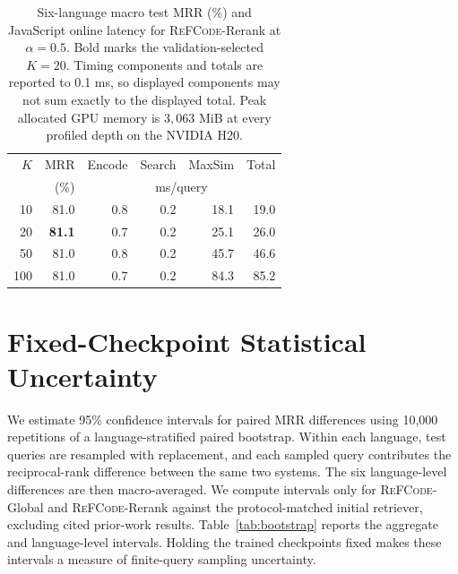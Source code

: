 \documentclass[11pt]{article}
\newcommand{\method}{\textsc{ReFCode}}
\begin{document}
\begin{table}[!t]
    \centering
    \captionsetup{skip=2pt}
    \scriptsize
    \setlength{\tabcolsep}{2.0pt}
    \renewcommand{\arraystretch}{0.92}
    \begin{tabular*}{\columnwidth}{@{\extracolsep{\fill}}rrrrrr@{}}
      \toprule
      \(K\) & MRR & Encode & Search & MaxSim & Total \\
      & (\%) & \multicolumn{4}{c}{ms/query} \\
      \midrule
      10  & 81.0 & 0.8 & 0.2 & 18.1 & 19.0 \\
      20  & \textbf{81.1} & 0.7 & 0.2 & 25.1 & 26.0 \\
      50  & 81.0 & 0.8 & 0.2 & 45.7 & 46.6 \\
      100 & 81.0 & 0.7 & 0.2 & 84.3 & 85.2 \\
      \bottomrule
    \end{tabular*}
    \caption{Six-language macro test MRR (\%) and JavaScript online latency for \method{}-Rerank at \(\alpha=0.5\). Bold marks the validation-selected \(K=20\). Timing components and totals are reported to 0.1 ms, so displayed components may not sum exactly to the displayed total. Peak allocated GPU memory is \(3{,}063\) MiB at every profiled depth on the NVIDIA H20.}
    \label{tab:reranking_efficiency_details}
\end{table}

\section{Fixed-Checkpoint Statistical Uncertainty}
\label{app:statistical_reliability}

We estimate 95\% confidence intervals for paired MRR differences using 10,000 repetitions of a language-stratified paired bootstrap. Within each language, test queries are resampled with replacement, and each sampled query contributes the reciprocal-rank difference between the same two systems. The six language-level differences are then macro-averaged. We compute intervals only for \method{}-Global and \method{}-Rerank against the protocol-matched initial retriever, excluding cited prior-work results. Table~\ref{tab:bootstrap} reports the aggregate and language-level intervals. Holding the trained checkpoints fixed makes these intervals a measure of finite-query sampling uncertainty.
\end{document}

